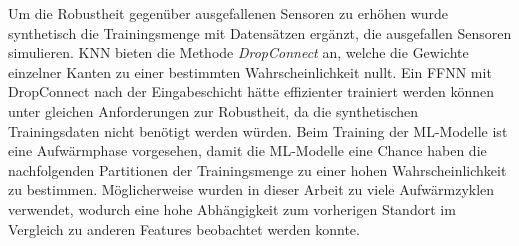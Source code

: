 \newline
\newline
Um die Robustheit gegenüber ausgefallenen Sensoren zu erhöhen wurde synthetisch die Trainingsmenge mit Datensätzen ergänzt, die ausgefallen Sensoren simulieren.
KNN bieten die Methode \textit{DropConnect} an, welche die Gewichte einzelner Kanten zu einer bestimmten Wahrscheinlichkeit nullt.
Ein FFNN mit DropConnect nach der Eingabeschicht hätte effizienter trainiert werden können unter gleichen Anforderungen zur Robustheit,
da die synthetischen Trainingsdaten nicht benötigt werden würden.
\newline
\newline
Beim Training der ML-Modelle ist eine Aufwärmphase vorgesehen, damit die ML-Modelle eine Chance haben die nachfolgenden Partitionen der Trainingsmenge
zu einer hohen Wahrscheinlichkeit zu bestimmen.
Möglicherweise wurden in dieser Arbeit zu viele Aufwärmzyklen verwendet, wodurch eine hohe Abhängigkeit zum vorherigen Standort im Vergleich zu anderen Features beobachtet werden konnte.

